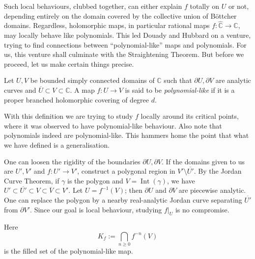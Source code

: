 \documentclass[11pt,a4paper]{article}
\begin{document}
Such local behaviours, clubbed together, can either explain $f$ totally
on $U$ or not, depending entirely on the domain covered by the
collective union of B\"ottcher domains. Regardless, holomorphic maps,
in particular rational maps $f\colon\widehat{\mathbb C}\to\widehat{\mathbb C}$,
may locally behave like polynomials. This led Douady and Hubbard on a
venture, trying to find connections between ``polynomial-like'' maps
and polynomials. For us, this venture shall culminate with the
Straightening Theorem. But before we proceed, let us make certain things
precise.

\setcounter{definition}{26}\begin{definition}
Let $U,V$ be bounded simply connected domains of $\mathbb C$ such that
$\partial U,\partial V$ are analytic curves and
$\overline U\subset V\subset\mathbb C$.
A map $f\colon U\to V$ is said to be \emph{polynomial-like} if it is a
proper branched holomorphic covering of degree $d$.
\end{definition}

\begin{remark}[1]
With this definition we are trying to study $f$ locally around its
critical points, where it was observed to have polynomial-like behaviour.
Also note that polynomials indeed are polynomial-like. This hammers home
the point that what we have defined is a generalisation.
\end{remark}
\begin{remark}[2]
One can loosen the rigidity of the boundaries $\partial U,\partial V$.
If the domains given to us are $U',V'$ and $f\colon U'\to V'$, construct
a polygonal region in $V'\setminus\overline{U'}$.
By the Jordan Curve Theorem, if $\gamma$ is the polygon and
$V=\operatorname{Int}(\gamma)$, we have
$U'\subset\overline{U'}\subset V\subset\overline V\subset V'$.
Let $U=f^{-1}(V)$; then $\partial U$ and $\partial V$ are piecewise
analytic. One can replace the polygon by a nearby real-analytic Jordan curve separating $\overline{U'}$ from $\partial V'$. Since our goal is local behaviour, studying $f|_U$ is no compromise.
\end{remark}

Here
\[
K_f:=\bigcap_{n\ge0}f^{-n}(V)
\]
is the filled set of the polynomial-like map.
\end{document}
